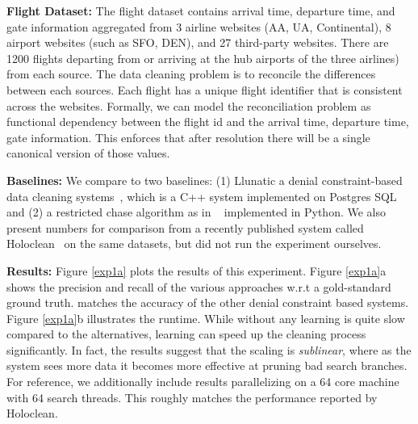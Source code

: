 \vspace{0.5em}\noindent\textbf{Flight Dataset: } The flight dataset contains arrival time, departure time, and gate information aggregated from 3 airline websites (AA, UA, Continental),
8 airport websites (such as SFO, DEN), and 27 third-party
websites.
There are 1200 flights departing from or arriving at the hub airports of the three airlines) from each source.
The data cleaning problem is to reconcile the differences between each sources.
Each flight has a unique flight identifier that is consistent across the websites.
Formally, we can model the reconciliation problem as functional dependency between the flight id and the arrival time, departure time, gate information.
This enforces that after resolution there will be a single canonical version of those values.

\vspace{0.5em}\noindent\textbf{Baselines: } We compare to two baselines: (1) Llunatic a denial constraint-based data cleaning systems~\cite{DBLP:conf/sigmod/DallachiesaEEEIOT13}, which is a C++ system implemented on Postgres SQL and (2) a restricted chase algorithm as in ~\cite{benedikt2017benchmarking} implemented in Python. We also present numbers for comparison from a recently published system called Holoclean~\cite{rekatsinas2017holoclean} on the same datasets, but did not run the experiment ourselves.


\vspace{0.5em}\noindent\textbf{Results: } Figure \ref{exp1a} plots the results of this experiment. Figure \ref{exp1a}a shows the precision and recall of the various approaches w.r.t a gold-standard ground truth. \sys matches the accuracy of the other denial constraint based systems. Figure \ref{exp1a}b illustrates the runtime. While \sys without any learning is quite slow compared to the alternatives, learning can speed up the cleaning process significantly.
In fact, the results suggest that the scaling is \emph{sublinear}, where as the system sees more data it becomes more effective at pruning bad search branches.
For reference, we additionally include results parallelizing \sys on a 64 core machine with 64 search threads. This roughly matches the performance reported by Holoclean. 


